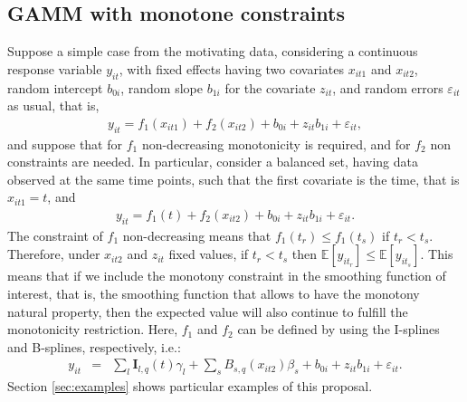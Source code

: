 \documentclass[11pt,letterpaper]{article}
\begin{document}
\subsection{GAMM with monotone constraints}\label{sec:gammconstraints}


Suppose a simple case from the motivating data, considering a continuous response variable $y_{it}$, with fixed effects having two covariates $x_{it1}$ and $x_{it2}$, random intercept $b_{0i}$,  random slope   $b_{1i}$ for the covariate $z_{it}$, and random errors  $\varepsilon_{it}$ as usual, that is, 
\begin{eqnarray*} 
y_{it} = f_1(x_{it1}) + f_2(x_{it2}) + b_{0i} + z_{it}b_{1i}  + \varepsilon_{it} , 
\end{eqnarray*}
and suppose that 
for $f_1$ non-decreasing monotonicity is required, and for $f_2$ non constraints are needed. 
In particular, consider a balanced set, having data observed at the same time points, such that the first covariate is the time, that is $x_{it1}=t$, and 
\begin{eqnarray*} 
y_{it} = f_1(t) + f_2(x_{it2}) +  b_{0i} + z_{it}b_{1i} +  \varepsilon_{it} . 
\end{eqnarray*}
The constraint of $f_1$ non-decreasing means that $f_{1}(t_r)\leq f_{1}(t_s)$ if $t_r< t_s$.  
Therefore, under $x_{it2}$ and $z_{it}$ fixed values, if 
$t_r< t_s$ 
 then  $\mathbb{E}\left[{y_{it_{r}}}\right] \leq \mathbb{E}\left[{y_{it_{s}}}\right]$. 
 This means that if we include the monotony constraint in the  smoothing function of interest, that is, the smoothing function that allows to have the monotony natural property, then the expected value will also continue to fulfill the monotonicity restriction. 
Here, $f_1$ and $f_2$ can be defined by using the I-splines and B-splines, respectively, i.e.: 
\begin{eqnarray*} 
y_{it}  &=& 
 \sum_{l} \boldsymbol{I}_{l,q}(t) \gamma_{l} +  \sum_{s}  B_{s,q}(x_{it2}) \beta_s  + b_{0i} + z_{it}b_{1i}   + \varepsilon_{it}  . 
\end{eqnarray*} 
Section \ref{sec:examples} shows particular examples of this  proposal. 


\end{document}
